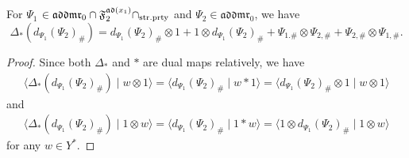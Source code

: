 \documentclass[15pt,oneside,reqno]{amsart}
\theoremstyle{remark}{
\newtheorem{lem}[df]{Lemma}
\newtheorem{prop}[df]{Proposition}
\newtheorem{ex}[df]{Example}
\newtheorem{rmk}[df]{Remark}
}
\newcommand{\addmr}{\mathfrak{addmr}}
\newcommand{\ad}{\mathfrak{ad}}
\newcommand{\Fad}{\mathfrak{F}_2^{\ad(x_1)}}
\let\V\relax
\newcommand{\V}{\mathrm{V}}
\newcommand{\strprty}{\mathrm{str.prty}}
\begin{document}
\begin{prop}[ = Lemma \ref{lem:essential}]
For $\Psi_1$ $\in \addmr_0 \cap \Fad \cap \V_{\strprty}$ and $\Psi_2\in \addmr_0$, we have
\[
\Delta_*(d_{\Psi_1}(\Psi_2)_{\#}) = d_{\Psi_1}(\Psi_2)_{\#} \otimes 1 + 1\otimes d_{\Psi_1}(\Psi_2)_{\#} + \Psi_{1.\#}\otimes \Psi_{2,\#} + \Psi_{2,\#}\otimes \Psi_{1,\#}.
\]
\end{prop}

\begin{proof}
Since both $\Delta_*$ and $*$ are dual maps relatively, we have
\begin{align*}
\langle \Delta_*(d_{\Psi_1}(\Psi_2)_{\#}) \mid w \otimes 1\rangle = \langle d_{\Psi_1}(\Psi_2)_{\#} \mid w * 1\rangle 
=\langle d_{\Psi_1}(\Psi_2)_{\#} \otimes 1 \mid w \otimes 1\rangle
\end{align*}
and
\begin{align*}
\langle \Delta_*(d_{\Psi_1}(\Psi_2)_{\#}) \mid 1 \otimes w\rangle = \langle d_{\Psi_1}(\Psi_2)_{\#} \mid 1 * w\rangle 
=\langle 1\otimes d_{\Psi_1}(\Psi_2)_{\#}  \mid1\otimes  w \rangle
\end{align*}
for any $w \in Y^*$.


\end{proof}
\end{document}

